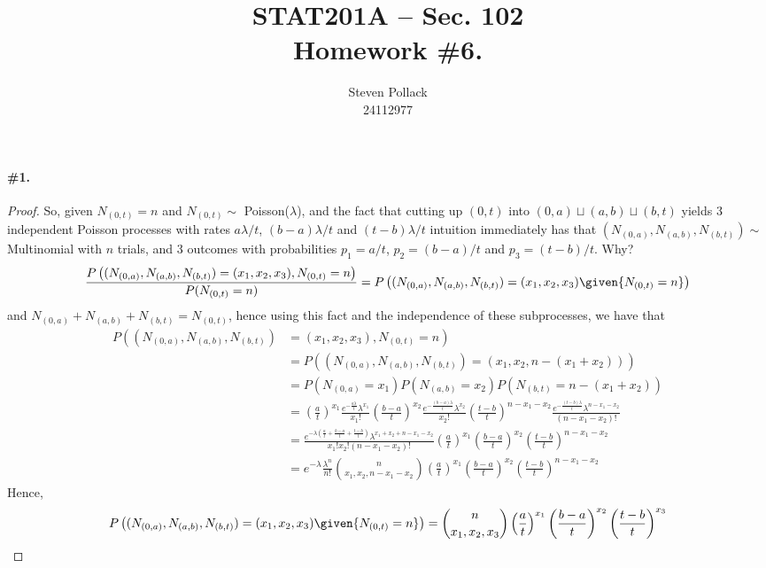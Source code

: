 \documentclass[12pt,titlepage]{article}
\title{STAT201A -- Sec. 102 \\ Homework \#6. }
\author{Steven Pollack \\ 24112977}
\date{}
\begin{document}
\maketitle

\pagestyle{empty}
\newpage
\pagestyle{fancy}
\paragraph{\#1.}
\begin{proof}
So, given $N_{(0,t)} = n$ and $N_{(0,t)}\sim $ Poisson($\lambda$), and the fact that cutting up $(0,t)$ into $(0,a) \sqcup (a,b) \sqcup (b,t)$ yields 3 independent Poisson processes with rates $a\lambda/t$, $(b-a)\lambda/t$ and $(t-b)\lambda/t$ intuition immediately has that $(N_{(0,a)}, N_{(a,b)}, N_{(b,t)}) \sim$ Multinomial with $n$ trials, and 3 outcomes with probabilities $p_{1} = a/t$, $p_{2} = (b-a)/t$ and $p_3 = (t-b)/t$. Why?
\[
\frac{P\left( (N_{(0,a)}, N_{(a,b)}, N_{(b,t)}) = (x_1, x_2, x_3) , N_{(0,t)} = n \right)}{P(N_{(0,t)}=n)} =P\left( (N_{(0,a)}, N_{(a,b)}, N_{(b,t)}) = (x_1, x_2, x_3) \given{N_{(0,t)} = n} \right)
\]
and $N_{(0,a)} + N_{(a,b)} + N_{(b,t)} = N_{(0,t)}$, hence using this fact and the independence of these subprocesses, we have that
\begin{align*}
P\left( (N_{(0,a)}, N_{(a,b)}, N_{(b,t)}) \right. &= \left. (x_1, x_2, x_3) , N_{(0,t)} = n \right) \\
&= P\left( (N_{(0,a)}, N_{(a,b)}, N_{(b,t)}) = (x_1, x_2, n-(x_1+x_2)) \right)\\
&= P(N_{(0,a)}=x_1)P(N_{(a,b)}=x_2)P(N_{(b,t)}=n-(x_1+x_2)) \\
&= \left(\frac{a}{t}\right)^{x_1} \frac{e^{-\frac{a\lambda}{t}} \lambda^{x_1}}{x_1 !}  \left(\frac{b-a}{t}\right)^{x_2} \frac{e^{-\frac{(b-a)\lambda}{t}} \lambda^{x_2}}{x_2 !}  \left(\frac{t-b}{t}\right)^{n-x_1-x_2} \frac{e^{-\frac{(t-b)\lambda}{t}} \lambda^{n-x_1-x_2}}{(n-x_1-x_2)!} \\
&=  \frac{e^{-\lambda( \frac{a}{t} + \frac{b-a}{t} + \frac{t-b}{t} )} \lambda^{x_1 + x_2 + n - x_1 - x_2}}{x_1 ! x_2 ! (n-x_1 - x_2)!}\left(\frac{a}{t}\right)^{x_1}\left(\frac{b-a}{t}\right)^{x_2}\left(\frac{t-b}{t}\right)^{n-x_1-x_2} \\
&= e^{-\lambda} \frac{\lambda^n}{n!} \binom{n}{x_1 , x_2 , n-x_1-x_2}\left(\frac{a}{t}\right)^{x_1}\left(\frac{b-a}{t}\right)^{x_2}\left(\frac{t-b}{t}\right)^{n-x_1-x_2}
\end{align*}
 Hence, 
\[
P\left( (N_{(0,a)}, N_{(a,b)}, N_{(b,t)}) = (x_1, x_2, x_3) \given{N_{(0,t)} = n} \right) = \binom{n}{x_1 , x_2 , x_3}\left(\frac{a}{t}\right)^{x_1}\left(\frac{b-a}{t}\right)^{x_2}\left(\frac{t-b}{t}\right)^{x_3}
\]
\end{proof}
\end{document}
